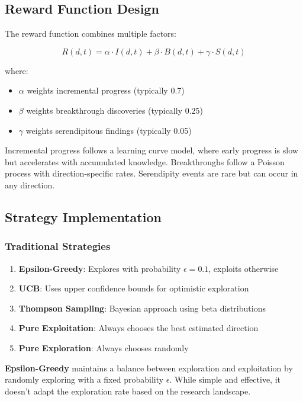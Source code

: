 \documentclass[letterpaper]{article} %
\begin{document}
\subsection{Reward Function Design}

The reward function combines multiple factors:

\begin{equation}
R(d, t) = \alpha \cdot I(d, t) + \beta \cdot B(d, t) + \gamma \cdot S(d, t)
\end{equation}

where:
\begin{itemize}
\item $\alpha$ weights incremental progress (typically 0.7)
\item $\beta$ weights breakthrough discoveries (typically 0.25)
\item $\gamma$ weights serendipitous findings (typically 0.05)
\end{itemize}

Incremental progress follows a learning curve model, where early progress is slow but accelerates with accumulated knowledge. Breakthroughs follow a Poisson process with direction-specific rates. Serendipity events are rare but can occur in any direction.

\subsection{Strategy Implementation}

\subsubsection{Traditional Strategies}

\begin{enumerate}
\item \textbf{Epsilon-Greedy}: Explores with probability $\epsilon = 0.1$, exploits otherwise
\item \textbf{UCB}: Uses upper confidence bounds for optimistic exploration
\item \textbf{Thompson Sampling}: Bayesian approach using beta distributions
\item \textbf{Pure Exploitation}: Always chooses the best estimated direction
\item \textbf{Pure Exploration}: Always chooses randomly
\end{enumerate}

\textbf{Epsilon-Greedy} maintains a balance between exploration and exploitation by randomly exploring with a fixed probability $\epsilon$. While simple and effective, it doesn't adapt the exploration rate based on the research landscape.
\end{document}
